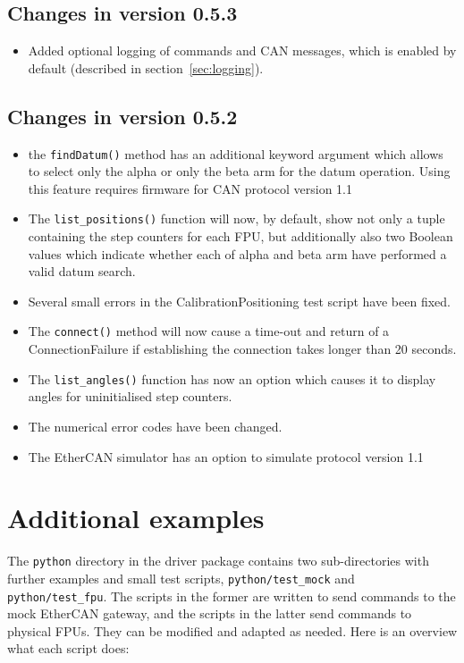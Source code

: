 \documentclass[11pt,a4paper]{scrartcl}
\begin{document}
\subsection*{Changes in version 0.5.3}
\begin{itemize}
\item Added optional logging of commands and CAN messages, which
  is enabled by default (described in section~\ref{sec:logging}).
\end{itemize}

\subsection*{Changes in version 0.5.2}
\begin{itemize}
\item the \texttt{findDatum()} method has an additional keyword
  argument which allows to select only the alpha or only the beta arm
  for the datum operation. Using this feature requires firmware for
  CAN protocol version 1.1
\item The \texttt{list\_positions()} function will now, by default,
  show not only a tuple containing the step counters for each FPU, but
  additionally also two Boolean values which indicate whether each of
  alpha and beta arm have performed a valid datum search.
\item Several small errors in the CalibrationPositioning test script
  have been fixed.
\item The \texttt{connect()} method will now cause a time-out and
  return of a ConnectionFailure if establishing the connection takes
  longer than 20 seconds.
\item The \texttt{list\_angles()} function has now an option which
  causes it to display angles for uninitialised step counters.
\item The numerical error codes have been changed.
\item The EtherCAN simulator has an option to simulate protocol version 1.1
\end{itemize}

\appendix

\section{Additional examples}
\label{sec:moreexamples}

The \texttt{python} directory in the driver package contains
two sub-directories with further examples and small test scripts,
\texttt{python/test\_mock} and \texttt{python/test\_fpu}. The scripts in
the former are written to send commands to the mock EtherCAN
gateway, and the scripts in the latter send commands
to physical FPUs. They can be modified and adapted
as needed. Here is an overview what each script does:
\end{document}
